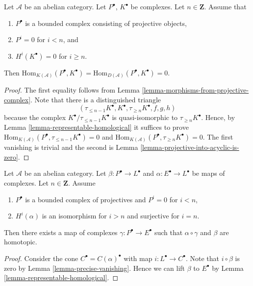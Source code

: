 \begin{lemma}
\label{lemma-precise-vanishing}
Let $\mathcal{A}$ be an abelian category.
Let $P^\bullet$, $K^\bullet$ be complexes.
Let $n \in \mathbf{Z}$. Assume that
\begin{enumerate}
\item $P^\bullet$ is a bounded complex consisting of projective
objects,
\item $P^i = 0$ for $i < n$, and
\item $H^i(K^\bullet) = 0$ for $i \geq n$.
\end{enumerate}
Then
$\text{Hom}_{K(\mathcal{A})}(P^\bullet, K^\bullet) =
\text{Hom}_{D(\mathcal{A})}(P^\bullet, K^\bullet) = 0$.
\end{lemma}

\begin{proof}
The first equality follows from
Lemma \ref{lemma-morphisms-from-projective-complex}.
Note that there is a distinguished triangle
$$
(\tau_{\leq n - 1}K^\bullet, K^\bullet, \tau_{\geq n}K^\bullet, f, g, h)
$$
because the complex $K^\bullet/\tau_{\leq n - 1}K^\bullet$ is
quasi-isomorphic to $\tau_{\geq n}K^\bullet$. Hence, by
Lemma \ref{lemma-representable-homological}
it suffices to prove
$\text{Hom}_{K(\mathcal{A})}(P^\bullet, \tau_{\leq n - 1}K^\bullet) = 0$ and
$\text{Hom}_{K(\mathcal{A})}(P^\bullet, \tau_{\geq n} K^\bullet) = 0$.
The first vanishing is trivial and the second is
Lemma \ref{lemma-projective-into-acyclic-is-zero}.
\end{proof}

\begin{lemma}
\label{lemma-lift-map}
Let $\mathcal{A}$ be an abelian category.
Let $\beta : P^\bullet \to L^\bullet$ and
$\alpha : E^\bullet \to L^\bullet$ be
maps of complexes. Let $n \in \mathbf{Z}$. Assume
\begin{enumerate}
\item $P^\bullet$ is a bounded complex of projectives and
$P^i = 0$ for $i < n$,
\item $H^i(\alpha)$ is an isomorphism for $i > n$ and surjective
for $i = n$.
\end{enumerate}
Then there exists a map of complexes $\gamma : P^\bullet \to E^\bullet$
such that $\alpha \circ \gamma$ and $\beta$ are homotopic.
\end{lemma}

\begin{proof}
Consider the cone $C^\bullet = C(\alpha)^\bullet$ with map
$i : L^\bullet \to C^\bullet$.
Note that $i \circ \beta$ is zero by
Lemma \ref{lemma-precise-vanishing}.
Hence we can lift $\beta$ to $E^\bullet$ by
Lemma \ref{lemma-representable-homological}.
\end{proof}












